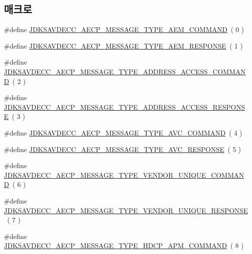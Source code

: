 \subsection*{매크로}
\begin{DoxyCompactItemize}
\item 
\#define \hyperlink{group__aecp__message__type_ga4625ce189cc209f42deb0629f48faf69}{J\+D\+K\+S\+A\+V\+D\+E\+C\+C\+\_\+\+A\+E\+C\+P\+\_\+\+M\+E\+S\+S\+A\+G\+E\+\_\+\+T\+Y\+P\+E\+\_\+\+A\+E\+M\+\_\+\+C\+O\+M\+M\+A\+ND}~( 0 )
\item 
\#define \hyperlink{group__aecp__message__type_ga9cad401e0f60634a8f084d93b0374d31}{J\+D\+K\+S\+A\+V\+D\+E\+C\+C\+\_\+\+A\+E\+C\+P\+\_\+\+M\+E\+S\+S\+A\+G\+E\+\_\+\+T\+Y\+P\+E\+\_\+\+A\+E\+M\+\_\+\+R\+E\+S\+P\+O\+N\+SE}~( 1 )
\item 
\#define \hyperlink{group__aecp__message__type_gab24ef3f0c1054f136d5c56c0c8bc3132}{J\+D\+K\+S\+A\+V\+D\+E\+C\+C\+\_\+\+A\+E\+C\+P\+\_\+\+M\+E\+S\+S\+A\+G\+E\+\_\+\+T\+Y\+P\+E\+\_\+\+A\+D\+D\+R\+E\+S\+S\+\_\+\+A\+C\+C\+E\+S\+S\+\_\+\+C\+O\+M\+M\+A\+ND}~( 2 )
\item 
\#define \hyperlink{group__aecp__message__type_ga4d8df21361c95f23016e03d0ef625dc0}{J\+D\+K\+S\+A\+V\+D\+E\+C\+C\+\_\+\+A\+E\+C\+P\+\_\+\+M\+E\+S\+S\+A\+G\+E\+\_\+\+T\+Y\+P\+E\+\_\+\+A\+D\+D\+R\+E\+S\+S\+\_\+\+A\+C\+C\+E\+S\+S\+\_\+\+R\+E\+S\+P\+O\+N\+SE}~( 3 )
\item 
\#define \hyperlink{group__aecp__message__type_gad297a615335f7d70d49993a0ee220dfd}{J\+D\+K\+S\+A\+V\+D\+E\+C\+C\+\_\+\+A\+E\+C\+P\+\_\+\+M\+E\+S\+S\+A\+G\+E\+\_\+\+T\+Y\+P\+E\+\_\+\+A\+V\+C\+\_\+\+C\+O\+M\+M\+A\+ND}~( 4 )
\item 
\#define \hyperlink{group__aecp__message__type_gaa1d24ecbbabf5293fb3753a413a7ec8d}{J\+D\+K\+S\+A\+V\+D\+E\+C\+C\+\_\+\+A\+E\+C\+P\+\_\+\+M\+E\+S\+S\+A\+G\+E\+\_\+\+T\+Y\+P\+E\+\_\+\+A\+V\+C\+\_\+\+R\+E\+S\+P\+O\+N\+SE}~( 5 )
\item 
\#define \hyperlink{group__aecp__message__type_gacab73895959eb753b503adc28096fdd5}{J\+D\+K\+S\+A\+V\+D\+E\+C\+C\+\_\+\+A\+E\+C\+P\+\_\+\+M\+E\+S\+S\+A\+G\+E\+\_\+\+T\+Y\+P\+E\+\_\+\+V\+E\+N\+D\+O\+R\+\_\+\+U\+N\+I\+Q\+U\+E\+\_\+\+C\+O\+M\+M\+A\+ND}~( 6 )
\item 
\#define \hyperlink{group__aecp__message__type_ga0ae19013f80cab20e33bdc804b7f1364}{J\+D\+K\+S\+A\+V\+D\+E\+C\+C\+\_\+\+A\+E\+C\+P\+\_\+\+M\+E\+S\+S\+A\+G\+E\+\_\+\+T\+Y\+P\+E\+\_\+\+V\+E\+N\+D\+O\+R\+\_\+\+U\+N\+I\+Q\+U\+E\+\_\+\+R\+E\+S\+P\+O\+N\+SE}~( 7 )
\item 
\#define \hyperlink{group__aecp__message__type_gad8bc8a9baa1622bd8eb8077cfc7683da}{J\+D\+K\+S\+A\+V\+D\+E\+C\+C\+\_\+\+A\+E\+C\+P\+\_\+\+M\+E\+S\+S\+A\+G\+E\+\_\+\+T\+Y\+P\+E\+\_\+\+H\+D\+C\+P\+\_\+\+A\+P\+M\+\_\+\+C\+O\+M\+M\+A\+ND}~( 8 )

\end{DoxyCompactItemize}
